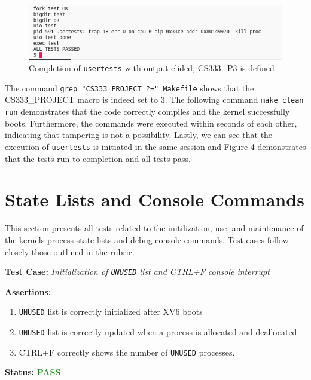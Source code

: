 \documentclass[11pt,letterpaper]{report}
\newcommand{\code}[1]{\colorbox{codegray}{\texttt{#1}}}
\begin{document}
{  \begin{figure}[h!]
	\centering
	\includegraphics[width=1\linewidth]{compilation2-usertests2.png}
	\caption[img]{Completion of \code{usertests} with output elided, CS333\_P3 is defined}
	\label{fig:P1compileP0-1}
  \end{figure}

  The command \code{grep "CS333\_PROJECT ?=" Makefile} shows that the CS333\_PROJECT macro
  is indeed set to 3. The following command \code{make clean run} demonstrates that the code
  correctly compiles and the kernel successfully boots. Furthermore, the commands were executed
  within seconds of each other, indicating that tampering is not a possibility. Lastly, we can
  see that the execution of \code{usertests} is initiated in the same session and Figure 4
  demonstrates that the tests run to completion and all tests pass. \\

  \pagebreak

  \section*{State Lists and Console Commands}
  This section presents all tests related to the initilization, use, and maintenance
  of the kernels process state lists and debug console commands. 
  Test cases follow closely those outlined in the rubric. \hfill \break
  
  \noindent\textbf{Test Case:} \emph{Initialization of \code{UNUSED} list and CTRL+F console interrupt}
  
  \noindent\textbf{Assertions:}
  \begin{enumerate}[]
  \item \code{UNUSED} list is correctly initialized after XV6 boots
  \item \code{UNUSED} list is correctly updated when a process is allocated and deallocated
  \item CTRL+F correctly shows the number of \code{UNUSED} processes.
  \end{enumerate}  
  
  \noindent\textbf{Status:} \textcolor{ForestGreen}{\textbf{PASS}}
  
}
\end{document}
